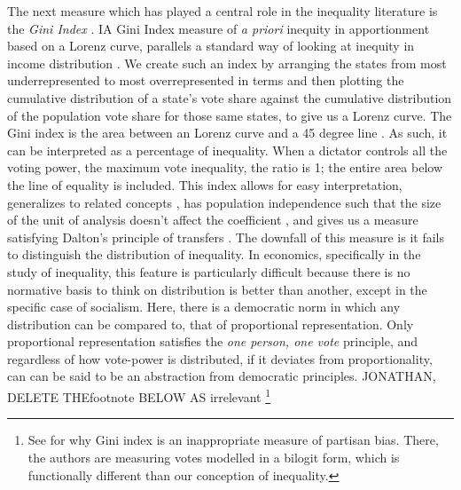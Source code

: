  The next measure which has played a central role in the inequality literature is the \textit{Gini Index} \citep{Gastwirth1972}. IA Gini Index measure of \textit{a priori} inequity in apportionment based on a Lorenz curve, parallels a standard way of looking at inequity in income distribution \citep[see e.g.,][]{BaiLagunoff2013}. We create such an index by arranging the states from most underrepresented to most overrepresented in terms and then plotting the cumulative distribution of a state's vote share against the cumulative distribution of the population vote share for those same states, to give us a Lorenz curve. The Gini index is the area between an Lorenz curve and a 45 degree line \citep{Dalton1920, Yntema1933,Sen1976, Yitzhaki1983}. As such, it can be interpreted as a percentage of inequality. When a dictator controls all the voting power, the maximum vote inequality, the ratio is 1; the entire area below the line of equality is included. This index allows for easy interpretation, generalizes to related concepts \citep{Sen1976, Yitzhaki1979}, has population independence such that the size of the unit of analysis doesn't affect the coefficient \citep{Gastwirth2017}, and gives us a measure satisfying Dalton's principle of transfers \citep{Dalton1920}. The downfall of this measure is it fails to distinguish the distribution of inequality. In economics, specifically in the study of inequality, this feature is particularly difficult because there is no normative basis to think on distribution is better than another, except in the specific case of socialism. Here, there is a democratic norm in which any distribution can be compared to, that of proportional representation. Only proportional representation satisfies the \textit{one person, one vote} principle, and regardless of how vote-power is distributed, if it deviates from proportionality, can can be said to be an abstraction from democratic principles.
 JONATHAN, DELETE THEfootnote  BELOW AS irrelevant
        \footnote{See \citet[][p. 316]{Browning_King_1987_seats_votes} for why Gini index is an inappropriate measure of partisan bias. There, the authors are measuring votes modelled in a bilogit form, which is functionally different than our conception of inequality.}
